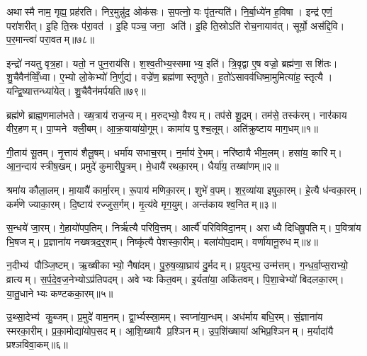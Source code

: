 अथास्मै नाम॒ गृह्य॒ प्रह॑रति। निर॒मुन्नु॑द॒ ओक॑सः। स॒पत्नो॒ यः पृ॑त॒न्यति॑। नि॒र्बा॒ध्ये॑न ह॒विषा। इन्द्र॑ एणं॒ परा॑शरीत्। इ॒हि ति॒स्रः प॑रा॒वत॑। इ॒हि पञ्च॒ जना॒ अति॑। इ॒हि ति॒स्रोऽति॑ रोच॒नायाव॑त्। सूर्यो॒ अस॑द्दि॒वि। प॒र॒मान्त्वा॑ परा॒वतम्॥७८॥

इन्द्रो॑ नयतु वृत्र॒हा। यतो॒ न पुन॒राय॑सि। श॒श्व॒तीभ्य॒स्समाभ्य॒ इति॑। त्रि॒वृद्वा ए॒ष वज्रो॒ ब्रह्म॑णा॒ सशि॑तः। शु॒चैवैन॑व्विँ॒ध्वा। ए॒भ्यो लो॒केभ्यो॑ नि॒र्णुद्य॑। वज्रे॑ण॒ ब्रह्म॑णा स्तृणुते। ह॒तो॑ऽसावव॑धिष्मा॒मुमित्या॑ह॒ स्तृत्यै। यन्द्वि॒ष्यात्तन्ध्या॑येत्। शु॒चैवैन॑मर्पयति॥७९॥



\clearpage
{}
\setcounter{anuvakam}{0}
ब्रह्म॑णे ब्राह्म॒णमाल॑भते। ख्ष॒त्राय॑ राज॒न्यम्। म॒रुद्भ्यो॒ वैश्यम्। तप॑से शू॒द्रम्। तम॑से॒ तस्क॑रम्। नार॑काय वीर॒हणम्। पा॒प्मने क्ली॒बम्। आ॒क्र॒याया॑यो॒गूम्। कामा॑य पुश्च॒लूम्। अति॑क्रुष्टाय माग॒धम्॥१॥

गी॒ताय॑ सू॒तम्। नृ॒त्ताय॑ शैलू॒षम्। धर्मा॑य सभाच॒रम्। न॒र्माय॑ रे॒भम्। नरि॑ष्ठायै भीम॒लम्। हसा॑य॒ कारिम्। आ॒न॒न्दाय॑ स्त्रीष॒खम्। प्रमुदे॑ कुमारीपु॒त्रम्। मे॒धायै॑ रथका॒रम्। धैर्या॑य॒ तख्षा॑णम्॥२॥

श्रमा॑य कौला॒लम्। मा॒यायै॑ कार्मा॒रम्। रू॒पाय॑ मणिका॒रम्। शुभे॑ व॒पम्। श॒र॒व्या॑या इषुका॒रम्। हे॒त्यै ध॑न्वका॒रम्। कर्म॑णे ज्याका॒रम्। दि॒ष्टाय॑ रज्जुस॒र्गम्। मृ॒त्य॑वे मृग॒युम्। अन्त॑काय श्व॒नितम्॥३॥

स॒न्धये॑ जा॒रम्। गे॒हायो॑पप॒तिम्। निर्\mbox{}ऋ॑त्यै परिवि॒त्तम्। आर्त्यै॑ परिविविदा॒नम्। अराध्यै दिधिषू॒पतिम्। प॒वित्रा॑य भि॒षजम्। प्र॒ज्ञाना॑य नख्षत्रद॒र्॒शम्। निष्कृ॑त्यै पेशस्का॒रीम्। बला॑योप॒दाम्। वर्णा॑यानू॒रुधम्॥४॥

न॒दीभ्य॑ पौञ्जि॒ष्टम्। ऋ॒ख्षीकाभ्यो॒ नैषा॑दम्। पु॒रु॒ष॒व्या॒घ्राय॑ दु॒र्मदम्। प्र॒युद्भ्य॒ उन्म॑त्तम्। ग॒न्ध॒र्वा॒प्स॒राभ्यो॒ व्रात्यम्। स॒र्प॒दे॒व॒ज॒नेभ्योऽप्र॑तिपदम्। अवेभ्यः कित॒वम्। इ॒र्यता॑या॒ अकि॑तवम्। पि॒शा॒चेभ्यो॑ बिदलका॒रम्। या॒तु॒धानेभ्यः कण्टकका॒रम्॥५॥

उ॒थ्सा॒देभ्य॑ कु॒ब्जम्। प्र॒मुदे॑ वाम॒नम्। द्वा॒र्भ्यस्स्रा॒मम्। स्वप्ना॑या॒न्धम्। अध॑र्माय बधि॒रम्। सं॒ज्ञाना॑य स्मरका॒रीम्। प्र॒का॒मोद्या॑योप॒सदम्। आ॒शि॒ख्षायै प्र॒श्ञिनम्। उ॒प॒शि॑ख्षाया॑ अभिप्र॒श्ञिनम्। म॒र्यादा॑यै प्रश्ञविवा॒कम्॥६॥

